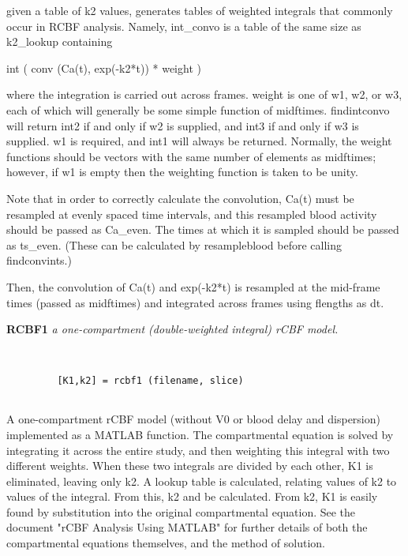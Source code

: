   given a table of k2 values, generates tables of weighted integrals
  that commonly occur in RCBF analysis.  Namely, int\_convo is a table of
  the same size as k2\_lookup containing
 
        int ( conv (Ca(t), exp(-k2*t)) * weight )
 
  where the integration is carried out across frames.  weight is
  one of w1, w2, or w3, each of which will generally be some simple
  function of midftimes.  findintconvo will return int2 if and only if
  w2 is supplied, and int3 if and only if w3 is supplied.  w1 is 
  required, and int1 will always be returned.  Normally, the weight
  functions should be vectors with the same number of elements as
  midftimes; however, if w1 is empty then the weighting function 
  is taken to be unity.
 
  Note that in order to correctly calculate the convolution, Ca(t) must
  be resampled at evenly spaced time intervals, and this resampled blood
  activity should be passed as Ca\_even.  The times at which it is
  sampled should be passed as ts\_even.  (These can be calculated by
  resampleblood before calling findconvints.)
 
  Then, the convolution of Ca(t) and exp(-k2*t) is resampled at the
  mid-frame times (passed as midftimes) and integrated across frames
  using flengths as dt.
\newpage


{\large\bf RCBF1} {\em a one-compartment (double-weighted integral) rCBF model.}
\begin{verbatim}


         [K1,k2] = rcbf1 (filename, slice)


\end{verbatim}

  A one-compartment rCBF model (without V0 or blood delay and 
  dispersion) implemented as a MATLAB function.  The
  compartmental equation is solved by integrating it across
  the entire study, and then weighting this integral with two
  different weights.  When these two integrals are divided by
  each other, K1 is eliminated, leaving only k2.  A lookup
  table is calculated, relating values of k2 to values of the
  integral.  From this, k2 and be calculated.  From k2, K1 is
  easily found by substitution into the original compartmental
  equation.  See the document "rCBF Analysis Using MATLAB" for
  further details of both the compartmental equations
  themselves, and the method of solution.
\newpage

